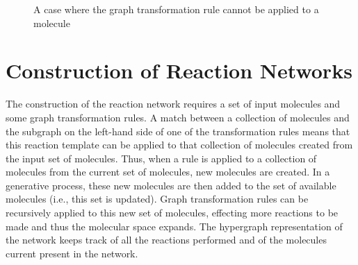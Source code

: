 \begin{figure}[!t]
    \centering
    \caption{A case where the graph transformation rule cannot be applied to a molecule}
    \label{fig:rule_application2}
\end{figure}


\section{Construction of Reaction Networks}

The construction of the reaction network requires a set of input molecules and some graph transformation rules. A match between a collection of molecules and the subgraph on the left-hand side of one of the transformation rules means that this reaction template can be applied to that collection of molecules created from the input set of molecules. Thus, when a rule is applied to a collection of molecules from the current set of molecules, new molecules are created. In a generative process, these new molecules are then added to the set of available molecules (i.e., this set is updated). Graph transformation rules can be recursively applied to this new set of molecules, effecting more reactions to be made and thus the molecular space expands. The hypergraph representation of the network keeps track of all the reactions performed and of the molecules current present in the network.

